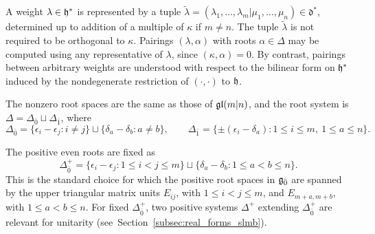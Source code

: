 A weight $\lambda\in{\mathfrak h}^{\ast}$ is represented by a tuple $\widetilde\lambda=(\lambda_1,\ldots,\lambda_m\vert\mu_1,\ldots,\mu_n)\in\mathfrak d^{\ast}$, determined up to addition of a multiple of $\kappa$ if $m\neq n$. The tuple $\widetilde\lambda$ is not required to be orthogonal to $\kappa$. Pairings $(\lambda,\alpha)$ with roots $\alpha\in\Delta$ may be computed using any representative of $\lambda$, since $(\kappa,\alpha)=0$. By contrast, pairings between arbitrary weights are understood with respect to the bilinear form on ${\mathfrak h}^{\ast}$ induced by the nondegenerate restriction of $(\cdot,\cdot)$ to ${\mathfrak h}$.

The nonzero root spaces are the same as those of ${\mathfrak{gl}}(m\vert n)$, and the root system is $\Delta=\Delta_{\bar0}\sqcup\Delta_{\bar1}$, where
\begin{equation}
\Delta_{\bar0}
=
\{\epsilon_i-\epsilon_j:i\neq j\}
\sqcup
\{\delta_a-\delta_b:a\neq b\},
\qquad
\Delta_{\bar1}
=
\{\pm(\epsilon_i-\delta_a):1\leq i\leq m,\ 1\leq a\leq n\}.
\label{eq:sl-roots}
\end{equation}

The positive even roots are fixed as
\begin{equation}
\Delta_{\bar0}^+
=
\{\epsilon_i-\epsilon_j:1\leq i<j\leq m\}
\sqcup
\{\delta_a-\delta_b:1\leq a<b\leq n\}.
\label{eq:sl-positive-even-roots}
\end{equation}
This is the standard choice for which the positive root spaces in ${\mathfrak{g}_{\bar{0}}}$ are spanned by the upper triangular matrix units $E_{ij}$, with $1\leq i<j\leq m$, and $E_{m+a,m+b}$, with $1\leq a<b\leq n$. For fixed $\Delta_{\bar{0}}^{+}$, two positive systems $\Delta^{+}$ extending $\Delta_{\bar{0}}^{+}$ are relevant for unitarity (see~Section~\ref{subsec:real_forms_slmb}).

